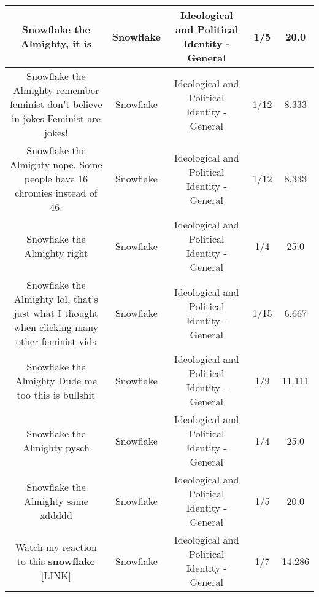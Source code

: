 \documentclass[11pt]{article}
\newlength\mylength
\begin{document}
\begin{center}
\begin{longtable}{|C{.65\mylength}|C{.30\mylength}|C{.12\mylength}|C{.12\mylength}|C{.12\mylength}|}
  \small Snowflake the Almighty, it is\normalsize   & Snowflake &  Ideological and Political Identity - General & 1/5 & 20.0 \\  \hline
  \small Snowflake the Almighty remember feminist don't believe in jokes Feminist are jokes!\normalsize   & Snowflake &  Ideological and Political Identity - General & 1/12 & 8.333 \\  \hline
  \small Snowflake the Almighty nope. Some people have 16 chromies instead of 46.\normalsize   & Snowflake &  Ideological and Political Identity - General & 1/12 & 8.333 \\  \hline
  \small Snowflake the Almighty right\normalsize   & Snowflake &  Ideological and Political Identity - General & 1/4 & 25.0 \\  \hline
  \small Snowflake the Almighty lol, that's just what I thought when clicking many other feminist vids\normalsize   & Snowflake &  Ideological and Political Identity - General & 1/15 & 6.667 \\  \hline
  \small Snowflake the Almighty Dude me too this is bullshit\normalsize   & Snowflake &  Ideological and Political Identity - General & 1/9 & 11.111 \\  \hline
  \small Snowflake the Almighty pysch\normalsize   & Snowflake &  Ideological and Political Identity - General & 1/4 & 25.0 \\  \hline
  \small Snowflake the Almighty same xddddd\normalsize   & Snowflake &  Ideological and Political Identity - General & 1/5 & 20.0 \\  \hline
  \small Watch my reaction to this \textbf{snowflake}  [LINK] \normalsize   & Snowflake &  Ideological and Political Identity - General & 1/7 & 14.286 \\  \hline

\end{longtable}
\end{center}
\end{document}
